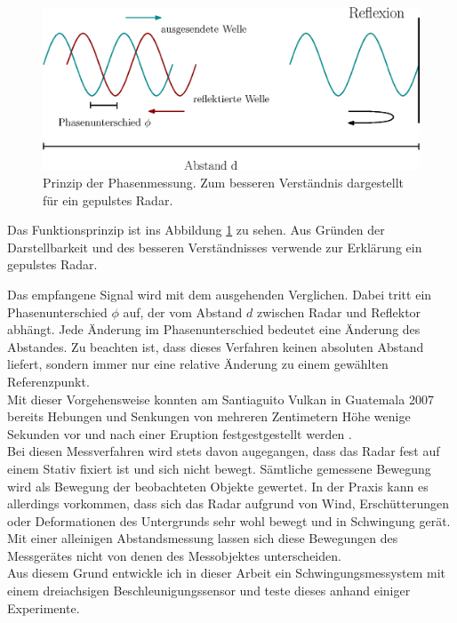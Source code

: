 \documentclass[12pt,a4paper]{scrartcl}
\begin{document}
\begin{figure}[htb]
\centering
\includegraphics[scale=.8]{phasenmessung.eps}
\caption{Prinzip der Phasenmessung. Zum besseren Verständnis dargestellt für ein gepulstes Radar.}
\label{phasenmessung}
\end{figure}

Das Funktionsprinzip ist ins Abbildung \ref{phasenmessung} zu sehen. Aus Gründen der Darstellbarkeit und des besseren Verständnisses verwende zur Erklärung ein gepulstes Radar.

Das empfangene Signal wird mit dem ausgehenden Verglichen. Dabei tritt ein Phasenunterschied $\phi$ auf, der vom Abstand $d$ zwischen Radar und Reflektor abhängt. Jede Änderung im Phasenunterschied bedeutet eine Änderung des Abstandes. Zu beachten ist, dass dieses Verfahren keinen absoluten Abstand liefert, sondern immer nur eine relative Änderung zu einem gewählten Referenzpunkt.\\

Mit dieser Vorgehensweise konnten am Santiaguito Vulkan in Guatemala 2007 bereits Hebungen und Senkungen von mehreren Zentimetern Höhe wenige Sekunden vor und nach einer Eruption festgestgestellt werden \citep{Scharff:2007uq}. \\

Bei diesen Messverfahren wird stets davon augegangen, dass das Radar fest auf einem Stativ fixiert ist und sich nicht bewegt. Sämtliche gemessene Bewegung wird als Bewegung der beobachteten Objekte gewertet. 
In der Praxis kann es allerdings vorkommen, dass sich das Radar aufgrund von Wind, Erschütterungen oder Deformationen des Untergrunds sehr wohl bewegt und in Schwingung gerät. Mit einer alleinigen Abstandsmessung lassen sich diese Bewegungen des Messgerätes nicht von denen des Messobjektes unterscheiden.\\

Aus diesem Grund entwickle ich in dieser Arbeit ein Schwingungsmessystem mit einem dreiachsigen Beschleunigungssensor und teste dieses anhand einiger Experimente.
\end{document}
